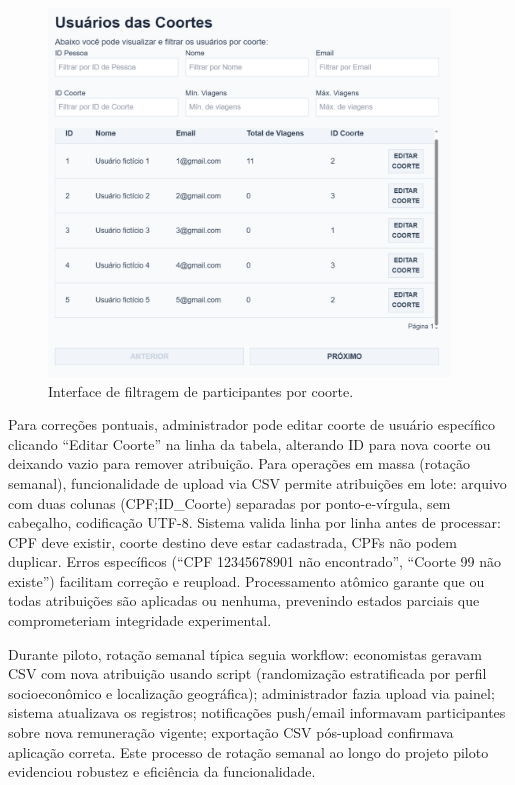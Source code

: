  \begin{figure}[H]
    \centering
    \includegraphics[width=0.95\textwidth]{figuras/usuario_coortes_zoom.PNG}
    \caption{Interface de filtragem de participantes por coorte.}
    \label{fig:coortes_listagem_usuarios}
  \end{figure}

Para correções pontuais, administrador pode editar coorte de usuário específico clicando ``Editar Coorte'' na linha da tabela, alterando ID para nova coorte ou deixando vazio para remover atribuição. Para operações em massa (rotação semanal), funcionalidade de upload via CSV permite atribuições em lote: arquivo com duas colunas (CPF;ID\_Coorte) separadas por ponto-e-vírgula, sem cabeçalho, codificação UTF-8. Sistema valida linha por linha antes de processar: CPF deve existir, coorte destino deve estar cadastrada, CPFs não podem duplicar. Erros específicos (``CPF 12345678901 não encontrado'', ``Coorte 99 não existe'') facilitam correção e reupload. Processamento atômico garante que ou todas atribuições são aplicadas ou nenhuma, prevenindo estados parciais que comprometeriam integridade experimental.

Durante piloto, rotação semanal típica seguia workflow: economistas geravam CSV com nova atribuição usando script (randomização estratificada por perfil socioeconômico e localização geográfica); administrador fazia upload via painel; sistema atualizava os registros; notificações push/email informavam participantes sobre nova remuneração vigente; exportação CSV pós-upload confirmava aplicação correta. Este processo de rotação semanal ao longo do projeto piloto evidenciou robustez e eficiência da funcionalidade.

